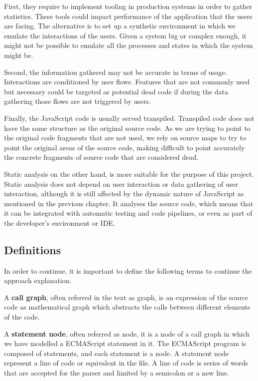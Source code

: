 \documentclass{uvamscse}
\begin{document}
First, they require to implement tooling in production systems in order to gather statistics. These tools could impact performance of the application that the users are facing. The alternative is to set up a synthetic environment in which we emulate the interactions of the users. Given a system big or complex enough, it might not be possible to emulate all the processes and states in which the system might be.

Second, the information gathered may not be accurate in terms of usage. Interactions are conditioned by user flows. Features that are not commonly used but necessary could be targeted as potential dead code if during the data gathering those flows are not triggered by users.

Finally, the JavaScript code is usually served transpiled. Transpiled code does not have the same structure as the original source code. As we are trying to point to the original code fragments that are not used, we rely on source maps to try to point the original areas of the source code, making difficult to point accurately the concrete fragments of source code that are considered dead.

Static analysis on the other hand, is more suitable for the purpose of this project. Static analysis does not depend on user interaction or data gathering of user interaction, although it is still affected by the dynamic nature of JavaScript as mentioned in the previous chapter. It analyses the source code, which means that it can be integrated with automatic testing and code pipelines, or even as part of the developer's environment or IDE.

\subsection{Definitions}
In order to continue, it is important to define the following terms to continue the approach explanation.

A \textbf{call graph}, often referred in the text as graph, is an expression of the source code as mathematical graph which abstracts the calls between different elements of the code.

A \textbf{statement node}, often referred as node, it is a node of a call graph in which we have modelled a ECMAScript statement in it. The ECMAScript program is composed of statements, and each statement is a node. A statement node represent a line of code or equivalent in the file. A line of code is series of words that are accepted for the parser and limited by a semicolon or a new line.
\end{document}
